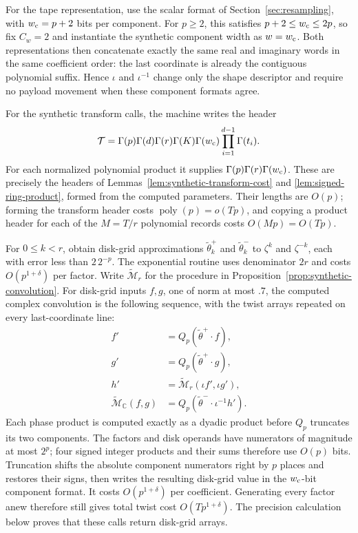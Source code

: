 \documentclass[11pt]{article}
\theoremstyle{definition}
\begin{document}
For the tape representation, use the scalar format of
Section~\ref{sec:resampling}, with $w_{\rm c}=p+2$ bits per component.
For $p\geq2$, this satisfies $p+2\leq w_{\rm c}\leq2p$, so fix $C_w=2$
and instantiate the synthetic component width as $w=w_{\rm c}$.
Both representations then concatenate exactly the same real and
imaginary words in the same coefficient order: the last coordinate is
already the contiguous polynomial suffix. Hence $\iota$ and
$\iota^{-1}$ change only the shape descriptor and require no payload
movement when these component formats agree.

For the synthetic transform calls, the machine writes the header
\[
 \mathcal T=\Gamma(p)\Gamma(d)\Gamma(r)\Gamma(K)\Gamma(w_{\rm c})
       \prod_{i=1}^{d-1}\Gamma(t_i).
\]
For each normalized polynomial product it supplies
$\Gamma(p)\Gamma(r)\Gamma(w_{\rm c})$. These are precisely the headers
of Lemmas~\ref{lem:synthetic-transform-cost} and
\ref{lem:signed-ring-product}, formed from the computed parameters.
Their lengths are $O(p)$; forming the transform header costs
$\operatorname{poly}(p)=o(Tp)$, and copying a product header for each of
the $M=T/r$ polynomial records costs $O(Mp)=O(Tp)$.

For $0\le k<r$, obtain disk-grid approximations
$\widetilde\theta_k^+$ and $\widetilde\theta_k^-$ to $\zeta^k$ and
$\zeta^{-k}$, each with error less than $2\,2^{-p}$.  The exponential
routine uses denominator $2r$ and costs $O(p^{1+\delta})$ per factor.
Write $\widetilde{\mathcal M}_r$ for the procedure in
Proposition~\ref{prop:synthetic-convolution}.  For disk-grid inputs
$f,g$, one of norm at most $.7$, the computed complex convolution is the
following sequence,
with the twist arrays repeated on every last-coordinate line:
\[
 \begin{aligned}
 f'&=Q_p(\widetilde\theta^+\mathbin{\cdot}f),\\
 g'&=Q_p(\widetilde\theta^+\mathbin{\cdot}g),\\
 h'&=\widetilde{\mathcal M}_r(\iota f',\iota g'),\\
 \widetilde{\mathcal M}_{\mathbb C}(f,g)
   &=Q_p\!\left(\widetilde\theta^-\mathbin{\cdot}
                    \iota^{-1}h'\right).
 \end{aligned}
\]
Each phase product is computed exactly as a dyadic product before
$Q_p$ truncates its two components. The factors and disk operands have
numerators of magnitude at most $2^p$; four signed integer products and
their sums therefore use $O(p)$ bits. Truncation shifts the absolute
component numerators right by $p$ places and restores their signs, then
writes the resulting disk-grid value in the $w_{\rm c}$-bit component
format. It costs $O(p^{1+\delta})$ per coefficient. Generating every
factor anew therefore still gives total
twist cost $O(Tp^{1+\delta})$. The precision calculation below proves
that these calls return disk-grid arrays.
\end{document}
